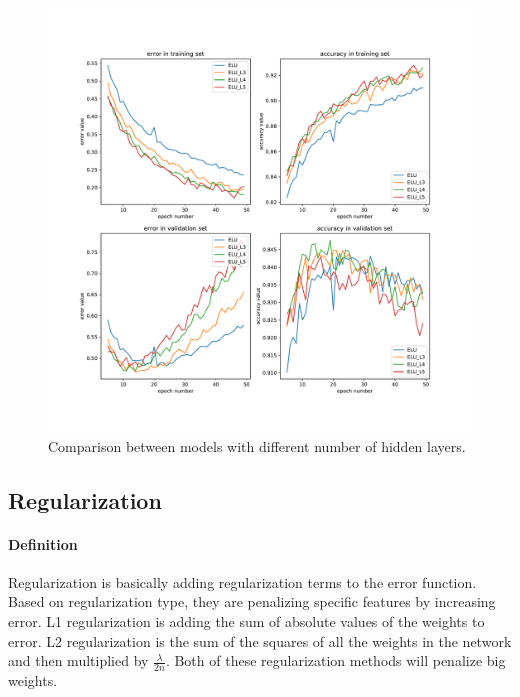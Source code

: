 \documentclass{article}
\begin{document}
\begin{figure}[tb]
\begin{center}
\centerline{\includegraphics[width=\columnwidth]{fig/num_layer.pdf}}
\caption{Comparison between models with different number of hidden layers. }
\label{fig:base_num_layer}
\end{center}
\end{figure} 










\subsection{Regularization}

\paragraph{Definition}
Regularization is basically adding regularization terms to the error function. Based on regularization type, they are penalizing specific features by increasing error. L1 regularization is adding the sum of absolute values of the weights to error. L2 regularization is the sum of the squares of all the weights in the network and then multiplied by $\frac{\lambda}{2n}$. Both of these regularization methods will penalize big weights. %
\end{document}
